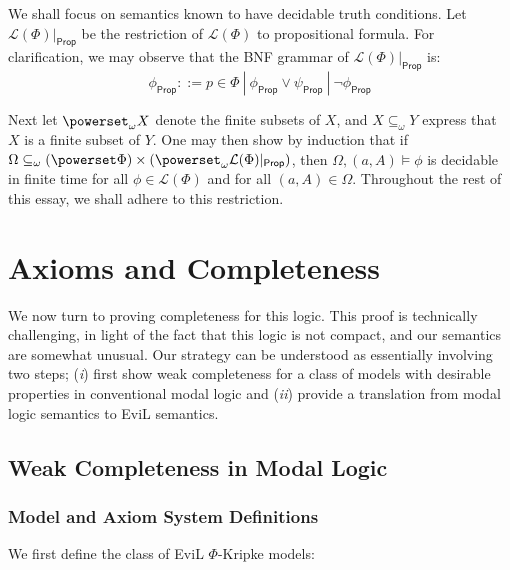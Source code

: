 \documentclass[11pt]{article}
\begin{document}
We shall focus on semantics known to have decidable truth conditions.  Let $\mathcal{L}(\Phi)|_{\mathsf{Prop}}$ be the restriction of  $\mathcal{L}(\Phi)$ to propositional formula.  For clarification, we may observe that the BNF grammar of $\mathcal{L}(\Phi)|_{\mathsf{Prop}}$ is:
$$\phi_{\mathsf{Prop}} ::= p \in \Phi \ |\ \phi_{\mathsf{Prop}} \vee \psi_{\mathsf{Prop}} \ | \ \neg \phi_{\mathsf{Prop}}$$

Next let $\powerset_\omega X$ denote the finite subsets of $X$, and $X \subseteq_\omega Y$ express 
that $X$ is a finite subset of $Y$.  One may then show by induction that if 
$\Omega \subseteq_\omega (\powerset \Phi) \times (\powerset_\omega \mathcal{L}(\Phi)|_{\mathsf{Prop}})$, 
then $\Omega,(a,A) \models \phi$ is decidable in finite time for all 
$\phi \in \mathcal{L}(\Phi)$ and for all $(a,A) \in \Omega$.  Throughout the rest of this essay, we shall adhere to this restriction.

\section{Axioms and Completeness}

We now turn to proving completeness for this logic.  This proof is technically challenging, in light of the fact that this logic is not compact, and our semantics are somewhat unusual.  Our strategy can be understood as essentially involving two steps; (\emph{i}) first show weak completeness for a class of models with desirable properties in conventional modal logic and (\emph{ii})  provide a translation from modal logic semantics to \textsf{EviL} semantics.

\subsection{Weak Completeness in Modal Logic}

\subsubsection{Model and Axiom System Definitions}

We first define the class of \textsf{EviL} $\Phi$-Kripke models:
\end{document}
